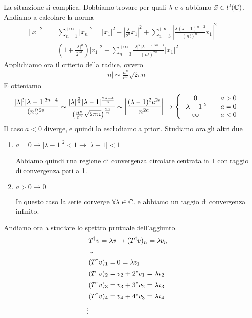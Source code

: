 \begin{enumerate}
		La situazione si complica. Dobbiamo trovare per quali $\lambda$ e $a$ abbiamo $\vec{x}\in l^2(\mathbb{C})$. Andiamo a calcolare la norma
		\begin{align}
			||x||^2 &= \sum_{n=1}^{+\infty} |x_n|^2 = |x_1|^2 + \left| \frac{\lambda}{2^a} x_1 \right|^2 + \sum_{n=3}^{+\infty} \left| \frac{\lambda(\lambda -1)^{n-2} }{(n!)^a} x_1 \right|^2 = \nonumber \\
			&= \left( 1 + \frac{|\lambda|^2}{2^{2a}} \right) |x_1|^2 + \sum_{n=3}^{+\infty}  \frac{|\lambda|^2|\lambda -1|^{2n-4} }{(n!)^{2a}} \left| x_1 \right|^2
		\end{align}
		Applichiamo ora il criterio della radice, ovvero
		\begin{align}
			n| \sim \frac{n^n}{e^n} \sqrt{2\pi n}
		\end{align}
		E otteniamo
		\begin{align}
			\frac{|\lambda|^2|\lambda -1|^{2n-4} }{(n!)^{2a}} \sim \frac{|\lambda|^\frac{2}{n}|\lambda -1|^\frac{{2n-4}}{n} }{\left(\frac{n^n}{e^n} \sqrt{2\pi n}\right)^\frac{2a}{n}} \sim \left| \frac{(\lambda -1)^2 e^{2a}}{n^{2a}} \right| \to \left\{ \begin{array}{ccc} 0 \quad &a>0\\ |\lambda -1|^2 \quad &a=0\\ \infty \quad &a<0 \end{array} \right.
		\end{align}
		Il caso $a<0$ diverge, e quindi lo escludiamo a priori. Studiamo ora gli altri due
		\begin{enumerate}
			\item $a = 0 \to |\lambda -1|^2<1 \to |\lambda -1| < 1$ 
			
			Abbiamo quindi una regione di convergenza circolare centrata in 1 con raggio di convergenza pari a 1.
			
			\item $a > 0 \to 0$
			
			In questo caso la serie converge $\forall \lambda \in \mathbb{C}$, e abbiamo un raggio di convergenza infinito.
		\end{enumerate}
		
\end{enumerate}

\newpage

Andiamo ora a studiare lo spettro puntuale dell'aggiunto.
\begin{align}
	&T^\dagger v = \lambda v \to (T^\dagger  v)_n = \lambda v_n\\ &\downarrow \nonumber \\
	&(T^\dagger  v)_1 = 0 = \lambda v_1\\
	&(T^\dagger  v)_2 = v_2 + 2^a v_1 = \lambda v_2\\
	&(T^\dagger  v)_3 = v_3 + 3^a v_2 = \lambda v_3\\
	&(T^\dagger  v)_4 = v_4 + 4^a v_3 = \lambda v_4\\
	\vdots \nonumber
\end{align}

